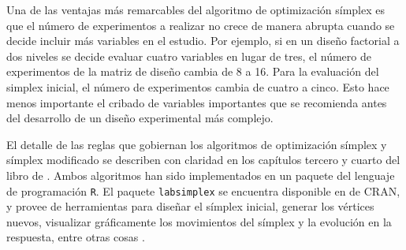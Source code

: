 Una de las ventajas más remarcables del algoritmo de optimización símplex es que el número de experimentos a realizar no crece de manera abrupta cuando se decide incluir más variables en el estudio. Por ejemplo, si en un diseño factorial a dos niveles se decide evaluar cuatro variables en lugar de tres, el número de experimentos de la matriz de diseño cambia de 8 a 16. Para la evaluación del simplex inicial, el número de experimentos cambia de cuatro a cinco. Esto hace menos importante el cribado de variables importantes que se recomienda antes del desarrollo de un diseño experimental más complejo.%

El detalle de las reglas que gobiernan los algoritmos de optimización símplex y símplex modificado se describen con claridad en los capítulos tercero y cuarto del libro de \citet{simplexbook}. Ambos algoritmos han sido implementados en un paquete del lenguaje de programación \verb|R|. El paquete \verb|labsimplex| se encuentra disponible en de CRAN, y provee de herramientas para diseñar el símplex inicial, generar los vértices nuevos, visualizar gráficamente los movimientos del símplex y la evolución en la respuesta, entre otras cosas \citep{labsimplex}.